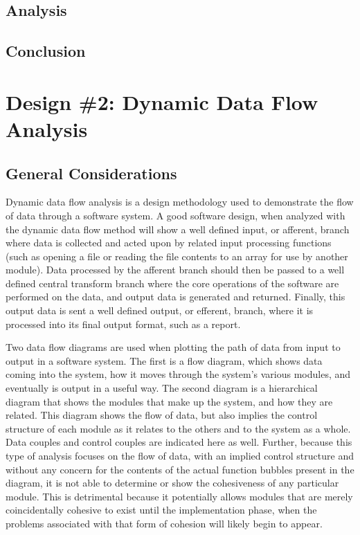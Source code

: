 \documentclass{article}
\begin{document}
	\subsection{Analysis}
	\subsection{Conclusion}
%
%
\section{Design \#2: Dynamic Data Flow Analysis}
	\subsection{General Considerations}
		Dynamic data flow analysis is a design methodology used to demonstrate the flow of data through a software system. A good software design, when analyzed with the dynamic data flow method will show a well defined input, or afferent, branch where data is collected and acted upon by related input processing functions (such as opening a file or reading the file contents to an array for use by another module). Data processed by the afferent branch should then be passed to a well defined central transform branch where the core operations of the software are performed on the data, and output data is generated and returned. Finally, this output data is sent a well defined output, or efferent, branch, where it is processed into its final output format, such as a report. 
	
		Two data flow diagrams are used when plotting the path of data from input to output in a software system. The first is a flow diagram, which shows data coming into the system, how it moves through the system's various modules, and eventually is output in a useful way. The second diagram is a hierarchical diagram that shows the modules that make up the system, and how they are related. This diagram shows the flow of data, but also implies the control structure of each module as it relates to the others and to the system as a whole. Data couples and control couples are indicated here as well. Further, because this type of analysis focuses on the flow of data, with an implied control structure and without any concern for the contents of the actual function bubbles present in the diagram, it is not able to determine or show the cohesiveness of any particular module. This is detrimental because it potentially allows modules that are merely coincidentally cohesive to exist until the implementation phase, when the problems associated with that form of cohesion will likely begin to appear. 
\end{document}
